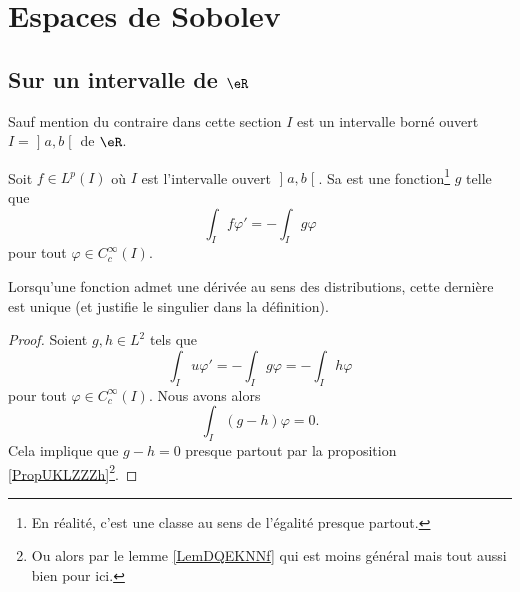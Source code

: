 
\section{Espaces de Sobolev}

\subsection{Sur un intervalle de \( \eR\)}

Sauf mention du contraire dans cette section \( I\) est un intervalle borné ouvert \( I=\mathopen] a , b \mathclose[\) de \( \eR\).

\begin{definition}
Soit \( f\in L^p(I)\) où \( I\) est l'intervalle ouvert \( \mathopen] a , b \mathclose[\). Sa  est une fonction\footnote{En réalité, c'est une classe au sens de l'égalité presque partout.} \( g\) telle que
        \begin{equation}
            \int_If\varphi'=-\int_Ig\varphi
        \end{equation}
        pour tout \( \varphi\in C^{\infty}_c(I)\).
\end{definition}

\begin{lemma}
    Lorsqu'une fonction admet une dérivée au sens des distributions, cette dernière est unique (et justifie le singulier dans la définition).
\end{lemma}

\begin{proof}
    Soient \( g,h\in L^2\) tels que 
    \begin{equation}
        \int_Iu\varphi'=-\int_Ig\varphi=-\int_Ih\varphi
    \end{equation}
    pour tout \( \varphi\in C^{\infty}_c(I)\). Nous avons alors
    \begin{equation}
        \int_I(g-h)\varphi=0.
    \end{equation}
    Cela implique que \( g-h=0\) presque partout par la proposition \ref{PropUKLZZZh}\footnote{Ou alors par le lemme \ref{LemDQEKNNf} qui est moins général mais tout aussi bien pour ici.}.
\end{proof}

